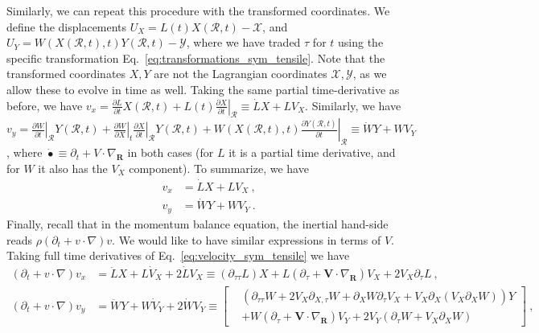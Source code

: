 \documentclass[12pt,a4paper]{article}
\begin{document}
Similarly, we can repeat this procedure with the transformed coordinates. We define the displacements $U_X = L\left(t\right) X\left(\mathcal{R},t\right) - \mathcal{X}$, and $U_Y = W\left(X\left(\mathcal{R},t\right),t\right) Y\left(\mathcal{R},t\right) - \mathcal{Y}$, where we have traded $\tau$ for $t$ using the specific transformation Eq.~\eqref{eq:transformations_sym_tensile}. Note that the transformed coordinates $X,Y$ are not the Lagrangian coordinates $\mathcal{X},\mathcal{Y}$, as we allow these to evolve in time as well. Taking the same partial time-derivative as before, we have $v_x = \frac{\partial L}{\partial t} X\left(\mathcal{R},t\right) + L\left(t\right)\left.\frac{\partial X}{\partial t}\right|_{\mathcal{R}}\equiv \dot{L} X + L V_X$. Similarly, we have $v_y = \left.\frac{\partial W}{\partial t}\right|_{\mathcal{R}}Y\left(\mathcal{R},t\right) + \left.\frac{\partial W}{\partial X}\right|_{t} \left.\frac{\partial X}{\partial t}\right|_{\mathcal{R}} Y\left(\mathcal{R},t\right) + W\left(X\left(\mathcal{R},t\right),t\right) \left.\frac{\partial Y\left(\mathcal{R},t\right)}{\partial t}\right|_{\mathcal{R}}\equiv \dot{W} Y + W V_Y$, where $\dot{\bullet}\equiv \partial_t+V\cdot\nabla_{\bm{R}}$ in both cases (for $L$ it is a partial time derivative, and for $W$ it also has the $V_X$ component). To summarize, we have
\begin{equation}\label{eq:velocity_sym_tensile}
  \begin{split}
     v_x & = \dot{L} X + L V_X \ ,\\
     v_y & = \dot{W} Y + W V_Y \ .
  \end{split}
\end{equation}
Finally, recall that in the momentum balance equation, the inertial hand-side reads $\rho \left(\partial_t + v\cdot\nabla\right)v$. We would like to have similar expressions in terms of $V$. Taking full time derivatives of Eq.~\eqref{eq:velocity_sym_tensile} we have
\begin{equation}\label{eq:accel_sym_tensile}
  \begin{split}
     \left(\partial_t + v\cdot\nabla\right)v_x & = \ddot{L} X + L \dot{V}_X + 2 \dot{L} V_X \equiv \left(\partial_{\tau\tau}L\right) X + L\left(\partial_\tau + \bm{V}\cdot\nabla_{\bm{R}}\right)V_X + 2 V_X \partial_\tau L \ ,\\
     \left(\partial_t + v\cdot\nabla\right)v_y & = \ddot{W} Y + W \dot{V}_Y + 2 \dot{W} V_Y \equiv \left[\begin{split}
                                                       &  \left(\partial_{\tau\tau}W + 2 V_X\partial_{X,\tau}W + \partial_X W \partial_\tau V_X + V_X\partial_X\left(V_X\partial_X W\right)\right)Y \\
                                                        & + W\left(\partial_\tau + \bm{V}\cdot\nabla_{\bm{R}}\right)V_Y + 2 V_Y \left(\partial_\tau W + V_X \partial_X W\right)
                                                   \end{split}\right] \ ,
  \end{split}
\end{equation}
\end{document}
